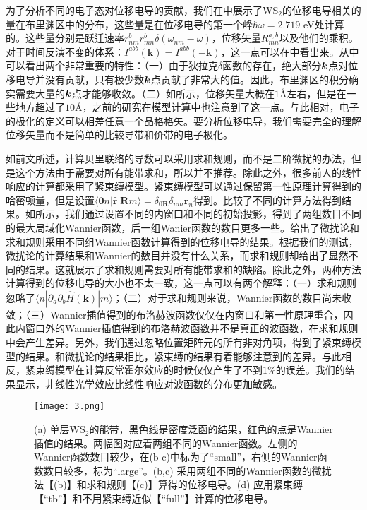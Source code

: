 为了分析不同的电子态对位移电导的贡献，我们在中展示了WS$_2$的位移电导相关的量在布里渊区中的分布，这些量是在位移电导的第一个峰$\hbar\omega = 2.719$ eV处计算的。这些量分别是跃迁速率$r_{nm}^{b}r_{mn}^{b}\delta(\omega_{nm}-\omega)$，位移矢量$R_{mn}^{a,b}$以及他们的乘积。对于时间反演不变的体系：$I^{abb}(\mathbf{k})=I^{abb}(-\mathbf{k})$，这一点可以在中看出来。从中可以看出两个非常重要的特性：（一）由于狄拉克$\delta$函数的存在，绝大部分$\boldsymbol{k}$点对位移电导并没有贡献，只有极少数$\boldsymbol{k}$点贡献了非常大的值。因此，布里渊区的积分确实需要大量的$\boldsymbol{k}$点才能够收敛。（二）如所示，位移矢量大概在$1$\AA 左右，但是在一些地方超过了$10$\AA ，之前的研究\cite{fregoso_quantitative_2016}在模型计算中也注意到了这一点。与此相对，电子的极化的定义可以相差任意一个晶格格矢。要分析位移电导，我们需要完全的理解位移矢量而不是简单的比较导带和价带的电子极化\cite{young2012}。


如前文所述，计算贝里联络的导数可以采用求和规则，而不是二阶微扰的办法，但是这个方法由于需要对所有能带求和，所以并不推荐。除此之外，很多前人的线性响应的计算都采用了紧束缚模型。紧束缚模型可以通过保留第一性原理计算得到的哈密顿量，但是设置$\langle\mathbf{0}n|\hat{\mathbf{r}}|\mathbf{R}m\rangle=\delta_{0\mathbf{R}}\delta_{nm}\mathbf{r}_{n}$得到。比较了不同的计算方法得到结果。如所示，我们通过设置不同的内窗口和不同的初始投影，得到了两组数目不同的最大局域化Wannier函数，后一组Wanier函数的数目更多一些。给出了微扰论和求和规则采用不同组Wannier函数计算得到的位移电导的结果。根据我们的测试，微扰论的计算结果和Wannier的数目并没有什么关系，而求和规则却给出了显然不同的结果。这就展示了求和规则需要对所有能带求和的缺陷。除此之外，两种方法计算得到的位移电导的大小也不太一致，这一点可以有两个解释：（一）求和规则忽略了$\langle n|\partial_{a}\partial_{b}\hat{H}(\mathbf{k})|m\rangle$；（二）对于求和规则来说，Wannier函数的数目尚未收敛；（三）Wannier插值得到的布洛赫波函数仅仅在内窗口和第一性原理重合，因此内窗口外的Wannier插值得到的布洛赫波函数并不是真正的波函数，在求和规则中会产生差异。另外，我们通过忽略位置矩阵元的所有非对角项，得到了紧束缚模型的结果。和微扰论的结果相比，紧束缚的结果有着能够注意到的差异。与此相反，紧束缚模型在计算反常霍尔效应的时候仅仅产生了不到$1\%$的误差\cite{wang_textitab_2006}。我们的结果显示，非线性光学效应比线性响应对波函数的分布更加敏感。

\begin{figure}
	\begin{centering}
	\texttt{[image: 3.png]}
	\par\end{centering}
	\caption{\label{fig3} (a) 单层WS$_2$的能带，黑色线是密度泛函的结果，红色的点是Wannier插值的结果。两幅图对应着两组不同的Wannier函数。左侧的Wannier函数数目较少，在(b-c)中标为了“small”，右侧的Wannier函数数目较多，标为“large”。(b,c) 采用两组不同的Wannier函数的微扰法【(b)】和求和规则【(c)】算得的位移电导。(d) 应用紧束缚【“tb”】和不用紧束缚近似【“full”】计算的位移电导。} 
	
\end{figure}



